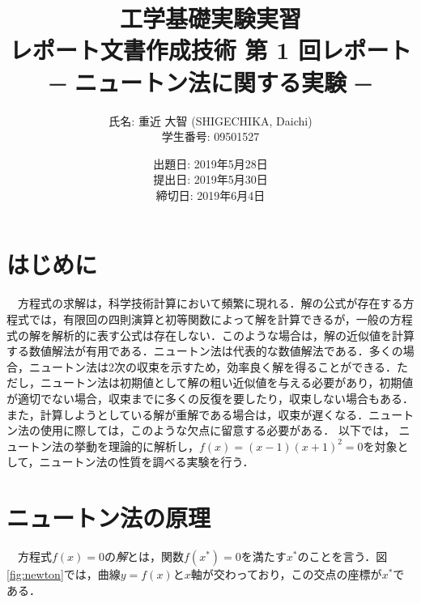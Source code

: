 \documentclass[a4j,11pt]{jarticle}
\title{工学基礎実験実習 \\
       レポート文書作成技術 第 1 回レポート\\─ ニュートン法に関する実験 ─}
\author{氏名: 重近 大智 (SHIGECHIKA, Daichi) \\
        学生番号: 09501527}
\date{出題日: 2019年5月28日 \\
      提出日: 2019年5月30日 \\
      締切日: 2019年6月4日 \\}
\begin{document}
\maketitle

\section{はじめに}
　方程式の求解は，科学技術計算において頻繁に現れる．解の公式が存在する方程式では，有限回の四則演算と初等関数によって解を計算できるが，一般の方程式の解を解析的に表す公式は存在しない．このような場合は，解の近似値を計算する数値解法が有用である．ニュートン法\cite{author1,author3}は代表的な数値解法である．多くの場合，ニュートン法は2次の収束を示すため，効率良く解を得ることができる．ただし，ニュートン法は初期値として解の粗い近似値を与える必要があり，初期値が適切でない場合，収束までに多くの反復を要したり，収束しない場合もある．また，計算しようとしている解が重解である場合は，収束が遅くなる．ニュートン法の使用に際しては，このような欠点に留意する必要がある．
以下では， ニュートン法の挙動を理論的に解析し，$f(x)=(x-1)(x+1)^2=0$を対象として，ニュートン法の性質を調べる実験を行う．
\section{ニュートン法の原理}
　方程式$f(x)=0$の{\em 解}とは，関数$f(x^*)=0$を満たす$x^*$のことを言う．図\ref{fig:newton}では，曲線$y=f(x)$と$x$軸が交わっており，この交点の座標が$x^*$である．
\end{document}
